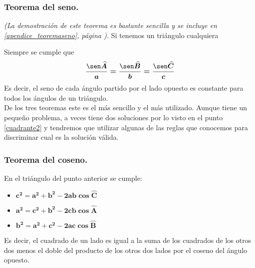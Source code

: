 \documentclass[a4paper,11pt,answers]{exam}
\begin{document}
\subsubsection{Teorema del seno.}
\emph{(La demostración de este teorema es bastante sencilla y se incluye en
  \ref{apendice_teoremaseno}, página \pageref{apendice_teoremaseno}).}
Si tenemos un triángulo cualquiera
\begin{center}
\end{center}
Siempre se cumple que
\[\boldsymbol{\frac{\sen \widehat{A}}{a} = \frac{\sen \widehat{B}}{b}
    =\frac{\sen \widehat{C}}{c}}\]
Es decir, el seno de cada ángulo partido por el lado opuesto es constante para todos los ángulos de un triángulo.\\

De los tres teoremas este es el más sencillo y el más utilizado. Aunque tiene un pequeño problema,
a veces tiene dos soluciones por lo visto en el punto \ref{cuadrante2} y tendremos que utilizar algunas de las reglas que conocemos para discriminar cual es la solución válida.

\subsubsection{Teorema del coseno.}
En el triángulo del punto anterior se cumple:
\begin{itemize}
\item $\boldsymbol{c^2= a^2 + b^2 - 2ab\cos \widehat{C}}$
\item $\boldsymbol{a^2= c^2 + b^2 - 2cb\cos \widehat{A}}$
\item $\boldsymbol{b^2= a^2 + c^2 - 2ac\cos \widehat{B}}$
\end{itemize}
Es decir, el cuadrado de un lado es igual a la suma de los cuadrados de los otros dos menos el doble del producto de los otros dos lados por el coseno del ángulo opuesto.\\
\end{document}
